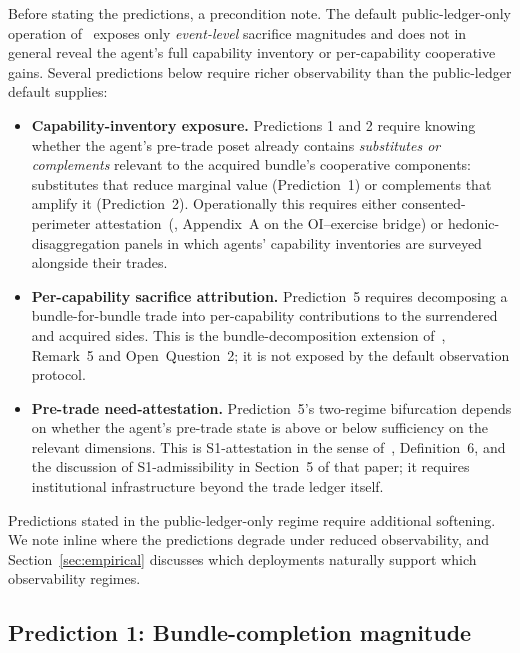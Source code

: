 Before stating the predictions, a precondition note.  The default
public-ledger-only operation of~\citep[Revealed~Sacrifice]{lasser2026paper8a}
exposes only \emph{event-level} sacrifice magnitudes and does not in
general reveal the agent's full capability inventory or per-capability
cooperative gains.  Several predictions below require richer
observability than the public-ledger default supplies:
\begin{itemize}
\item \textbf{Capability-inventory exposure.}  Predictions 1 and 2
  require knowing whether the agent's pre-trade poset already
  contains \emph{substitutes or complements} relevant to the
  acquired bundle's cooperative components: substitutes that
  reduce marginal value (Prediction~1) or complements that
  amplify it (Prediction~2).
  Operationally this requires either consented-perimeter
  attestation~(\citep[Revealed~Sacrifice]{lasser2026paper8a},
  Appendix~A on the OI--exercise bridge) or hedonic-disaggregation
  panels in which agents' capability inventories are surveyed
  alongside their trades.
\item \textbf{Per-capability sacrifice attribution.}  Prediction~5
  requires decomposing a bundle-for-bundle trade into per-capability
  contributions to the surrendered and acquired sides.  This is the
  bundle-decomposition extension of~\citep[Revealed~Sacrifice]{lasser2026paper8a},
  Remark~5 and Open~Question~2; it is not exposed by the default
  observation protocol.
\item \textbf{Pre-trade need-attestation.}  Prediction~5's two-regime
  bifurcation depends on whether the agent's pre-trade state is
  above or below sufficiency on the relevant dimensions.  This is
  S1-attestation in the sense of~\citep[Need~Sufficiency]{lasser2026paper8b},
  Definition~6, and the discussion of S1-admissibility in
  Section~5 of that paper; it requires institutional infrastructure
  beyond the trade ledger itself.
\end{itemize}
Predictions stated in the public-ledger-only regime require
additional softening.  We note inline where the predictions degrade
under reduced observability, and Section~\ref{sec:empirical}
discusses which deployments naturally support which observability
regimes.

\subsection{Prediction 1: Bundle-completion magnitude}
\label{sec:pred_bundle_completion}


